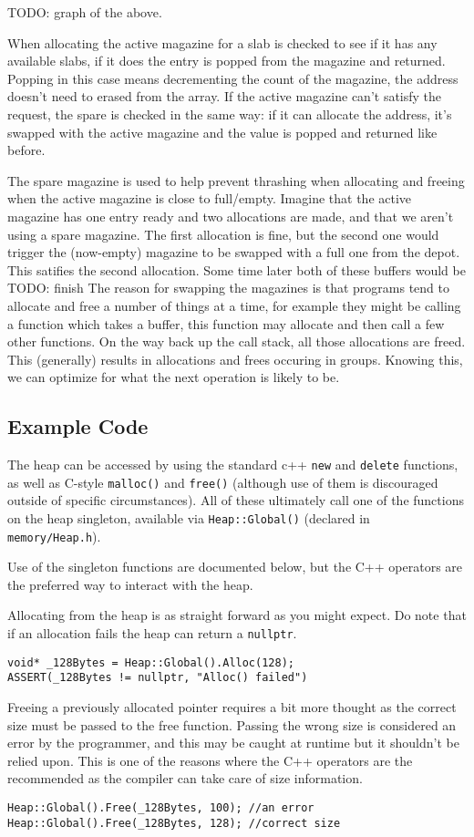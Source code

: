 TODO: graph of the above.

When allocating the active magazine for a slab is checked to see if it has any available slabs, if it does the entry is popped from the magazine and returned. Popping in this case means decrementing the count of the magazine, the address doesn't need to erased from the array. If the active magazine can't satisfy the request, the spare is checked in the same way: if it can allocate the address, it's swapped with the active magazine and the value is popped and returned like before. 

The spare magazine is used to help prevent thrashing when allocating and freeing when the active magazine is close to full/empty. Imagine that the active magazine has one entry ready and two allocations are made, and that we aren't using a spare magazine. The first allocation is fine, but the second one would trigger the (now-empty) magazine to be swapped with a full one from the depot. This satifies the second allocation. Some time later both of these buffers would be TODO: finish
The reason for swapping the magazines is that programs tend to allocate and free a number of things at a time, for example they might be calling a function which takes a buffer, this function may allocate and then call a few other functions. On the way back up the call stack, all those allocations are freed. This (generally) results in allocations and frees occuring in groups. Knowing this, we can optimize for what the next operation is likely to be.

\subsection{Example Code}
The heap can be accessed by using the standard c++ \verb|new| and \verb|delete| functions, as well as C-style \verb|malloc()| and \verb|free()| (although use of them is discouraged outside of specific circumstances). All of these ultimately call one of the functions on the heap singleton, available via \verb|Heap::Global()| (declared in \verb|memory/Heap.h|).

Use of the singleton functions are documented below, but the C++ operators are the preferred way to interact with the heap.

Allocating from the heap is as straight forward as you might expect. Do note that if an allocation fails the heap can return a \verb|nullptr|.
\begin{lstlisting}
void* _128Bytes = Heap::Global().Alloc(128);
ASSERT(_128Bytes != nullptr, "Alloc() failed")
\end{lstlisting}

Freeing a previously allocated pointer requires a bit more thought as the correct size must be passed to the free function. Passing the wrong size is considered an error by the programmer, and this may be caught at runtime but it shouldn't be relied upon. This is one of the reasons where the C++ operators are the recommended as the compiler can take care of size information.
\begin{lstlisting}
Heap::Global().Free(_128Bytes, 100); //an error
Heap::Global().Free(_128Bytes, 128); //correct size
\end{lstlisting}
